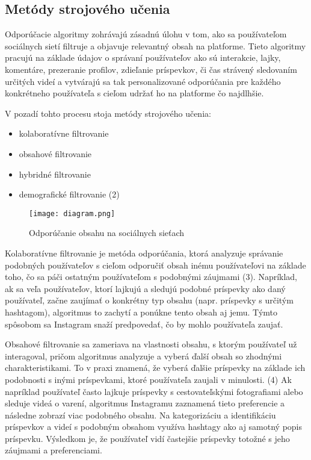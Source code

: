 \documentclass[10pt,twoside,slovak,a4paper]{article}
\begin{document}
\subsection{Metódy strojového učenia} 
Odporúčacie algoritmy zohrávajú zásadnú úlohu v tom, ako sa používateľom sociálnych sietí filtruje a objavuje relevantný obsah na platforme. Tieto algoritmy pracujú na základe údajov o správaní používateľov ako sú interakcie, lajky, komentáre, prezeranie profilov, zdieľanie príspevkov, či čas strávený sledovaním určitých videí a vytvárajú sa tak personalizované odporúčania pre každého konkrétneho používateľa s cieľom udržať ho na platforme čo najdlhšie. 

V pozadí tohto procesu stoja metódy strojového učenia:
\begin{itemize}
\item kolaboratívne filtrovanie
\item obsahové filtrovanie
\item hybridné filtrovanie
\item demografické filtrovanie (2)
\end{itemize}



\begin{figure*}[tbh]
\centering
\texttt{[image: diagram.png]}
\caption{Odporúčanie obsahu na sociálnych sieťach}
\end{figure*}

Kolaboratívne filtrovanie je metóda odporúčania, ktorá analyzuje správanie podobných používateľov s cieľom odporučiť obsah inému používateľovi na základe toho, čo sa páči ostatným používateľom s podobnými záujmami (3). Napríklad, ak sa veľa používateľov, ktorí lajkujú a sledujú podobné príspevky ako daný používateľ, začne zaujímať o konkrétny typ obsahu (napr. príspevky s určitým hashtagom), algoritmus to zachytí a ponúkne tento obsah aj jemu. Týmto spôsobom sa Instagram snaží predpovedať, čo by mohlo používateľa zaujať.

Obsahové filtrovanie sa zameriava na vlastnosti obsahu, s ktorým používateľ už interagoval, pričom algoritmus analyzuje a vyberá ďalší obsah so zhodnými charakteristikami. To v praxi znamená, že vyberá ďalšie príspevky na základe ich podobnosti s inými príspevkami, ktoré používateľa zaujali v minulosti. (4) Ak napríklad používateľ často lajkuje príspevky s cestovateľskými fotografiami alebo sleduje videá o varení, algoritmus Instagramu zaznamená tieto preferencie a následne zobrazí viac podobného obsahu. Na kategorizáciu a identifikáciu príspevkov a videí s podobným obsahom využíva hashtagy ako aj samotný popis príspevku. Výsledkom je, že používateľ vidí častejšie príspevky totožné s jeho záujmami a preferenciami.
\end{document}
